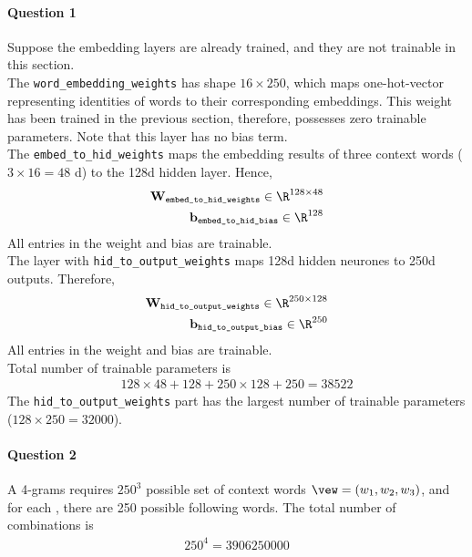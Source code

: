 \documentclass{article}
\begin{document}
    \paragraph{Question 1} Suppose the embedding layers are already trained, and they are not trainable in this section. \\
    The \texttt{word\_embedding\_weights} has shape $16 \times 250$, which maps one-hot-vector representing identities of words to their corresponding embeddings. This weight has been trained in the previous section, therefore, possesses zero trainable parameters. Note that this layer has no bias term.\\
    The \texttt{embed\_to\_hid\_weights} maps the embedding results of three context words ($3 \times 16 = 48$ d) to the 128d hidden layer. Hence,
    \begin{align}
    	\textbf{W}_\texttt{embed\_to\_hid\_weights} \in \R^{128 \times 48} \\
    	\textbf{b}_\texttt{embed\_to\_hid\_bias} \in \R^{128}
    \end{align}
    All entries in the weight and bias are trainable. \\
    The layer with \texttt{hid\_to\_output\_weights} maps 128d hidden neurones to 250d outputs. Therefore,
    \begin{align}
    	\textbf{W}_\texttt{hid\_to\_output\_weights} \in \R^{250 \times 128} \\
    	\textbf{b}_\texttt{hid\_to\_output\_bias} \in \R^{250}
    \end{align}
    All entries in the weight and bias are trainable. \\
    Total number of trainable parameters is
    \begin{align}
    	128 \times 48 + 128 + 250 \times 128 + 250 = 38522
    \end{align}
    The \texttt{hid\_to\_output\_weights} part has the largest number of trainable parameters ($128 \times 250 = 32000$).
    
    \paragraph{Question 2} A 4-grams requires $250^3$ possible set of context words $\vew = (w_1, w_2, w_3)$, and for each \vew, there are 250 possible following words. The total number of combinations is 
    \begin{align}
    	250^4 = 3906250000
    \end{align}
    
\end{document}

